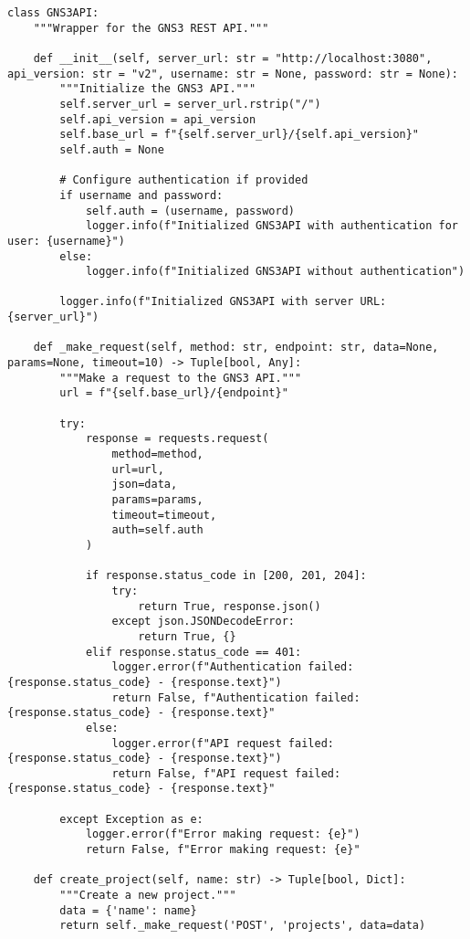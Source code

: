 \begin{lstlisting}[style=pythoncode, caption=GNS3 Integration Client]
class GNS3API:
    """Wrapper for the GNS3 REST API."""
    
    def __init__(self, server_url: str = "http://localhost:3080", api_version: str = "v2", username: str = None, password: str = None):
        """Initialize the GNS3 API."""
        self.server_url = server_url.rstrip("/")
        self.api_version = api_version
        self.base_url = f"{self.server_url}/{self.api_version}"
        self.auth = None
        
        # Configure authentication if provided
        if username and password:
            self.auth = (username, password)
            logger.info(f"Initialized GNS3API with authentication for user: {username}")
        else:
            logger.info(f"Initialized GNS3API without authentication")
        
        logger.info(f"Initialized GNS3API with server URL: {server_url}")
    
    def _make_request(self, method: str, endpoint: str, data=None, params=None, timeout=10) -> Tuple[bool, Any]:
        """Make a request to the GNS3 API."""
        url = f"{self.base_url}/{endpoint}"
        
        try:
            response = requests.request(
                method=method,
                url=url,
                json=data,
                params=params,
                timeout=timeout,
                auth=self.auth
            )
            
            if response.status_code in [200, 201, 204]:
                try:
                    return True, response.json()
                except json.JSONDecodeError:
                    return True, {}
            elif response.status_code == 401:
                logger.error(f"Authentication failed: {response.status_code} - {response.text}")
                return False, f"Authentication failed: {response.status_code} - {response.text}"
            else:
                logger.error(f"API request failed: {response.status_code} - {response.text}")
                return False, f"API request failed: {response.status_code} - {response.text}"
                
        except Exception as e:
            logger.error(f"Error making request: {e}")
            return False, f"Error making request: {e}"
    
    def create_project(self, name: str) -> Tuple[bool, Dict]:
        """Create a new project."""
        data = {'name': name}
        return self._make_request('POST', 'projects', data=data)
    

\end{lstlisting}
